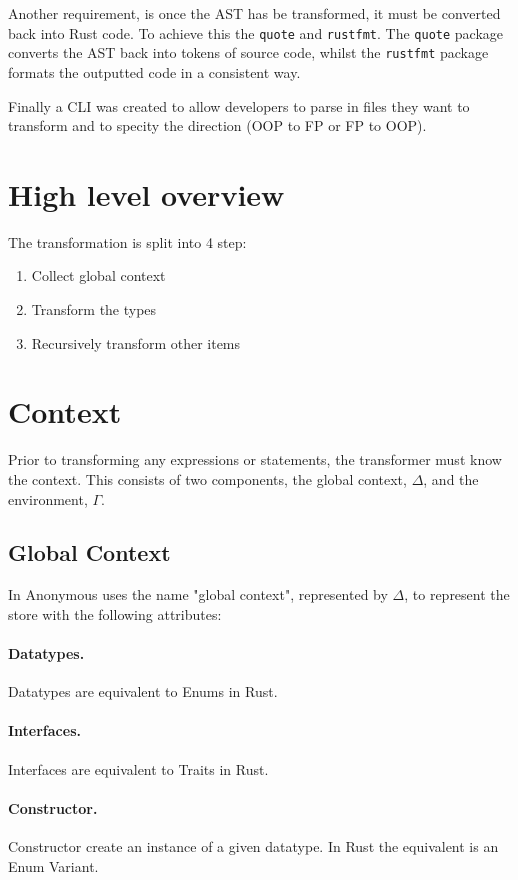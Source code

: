 \documentclass[ oneside,%
                    author={James Elgar},
                    degree={MEng},
                     title={Bidirectional transformer between functional and \\ object-oriented programming in Rust},
                  subtitle={}]{dissertation}
\newcommand{\weixin}{Anonymous }
\begin{document}
Another requirement, is once the AST has be transformed, it must be converted back into Rust code. To achieve this the \verb|quote| and \verb|rustfmt|. The \verb|quote|  package converts the AST back into tokens of source code, whilst the \verb|rustfmt| package formats the outputted code in a consistent way.

Finally a CLI was created to allow developers to parse in files they want to transform and to specity the direction (OOP to FP or FP to OOP).

\section{High level overview}

The transformation is split into 4 step:

\begin{enumerate}
    \item Collect global context
    \item Transform the types
    \item Recursively transform other items
\end{enumerate}


\section{Context}

Prior to transforming any expressions or statements, the transformer must know the context. This consists of two components, the global context, $\Delta$, and the environment, $\Gamma$.

\subsection{Global Context}

In \cite{food} \weixin uses the name "global context", represented by $\Delta$, to represent the store with  the following attributes:

\paragraph{Datatypes.} Datatypes are equivalent to Enums in Rust.
\paragraph{Interfaces.} Interfaces are equivalent to Traits in Rust.
\paragraph{Constructor.} Constructor create an instance of a given datatype. In Rust the equivalent is an Enum Variant.
\end{document}
